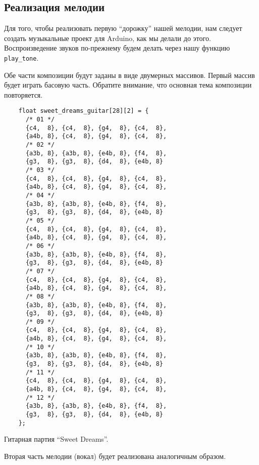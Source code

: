 \documentclass[../sparc.tex]{subfiles}
\begin{document}
\newpage
\subsection{Реализация мелодии}

Для того, чтобы реализовать первую ``дорожку'' нашей мелодии, нам следует
создать музыкальные проект для Arduino, как мы делали до этого.  Воспроизведение
звуков по-прежнему будем делать через нашу функцию \texttt{play\_tone}.

Обе части композиции будут заданы в виде двумерных массивов.  Первый массив
будет играть басовую часть.  Обратите внимание, что основная тема композиции
повторяется.

\begin{listing}[H]
  \begin{verbatim}
    float sweet_dreams_guitar[28][2] = {
      /* 01 */
      {c4,  8}, {c4,  8}, {g4,  8}, {c4,  8},
      {a4b, 8}, {c4,  8}, {g4,  8}, {c4,  8},
      /* 02 */
      {a3b, 8}, {a3b, 8}, {e4b, 8}, {f4,  8},
      {g3,  8}, {g3,  8}, {d4,  8}, {e4b, 8}
      /* 03 */
      {c4,  8}, {c4,  8}, {g4,  8}, {c4,  8},
      {a4b, 8}, {c4,  8}, {g4,  8}, {c4,  8},
      /* 04 */
      {a3b, 8}, {a3b, 8}, {e4b, 8}, {f4,  8},
      {g3,  8}, {g3,  8}, {d4,  8}, {e4b, 8}
      /* 05 */
      {c4,  8}, {c4,  8}, {g4,  8}, {c4,  8},
      {a4b, 8}, {c4,  8}, {g4,  8}, {c4,  8},
      /* 06 */
      {a3b, 8}, {a3b, 8}, {e4b, 8}, {f4,  8},
      {g3,  8}, {g3,  8}, {d4,  8}, {e4b, 8}
      /* 07 */
      {c4,  8}, {c4,  8}, {g4,  8}, {c4,  8},
      {a4b, 8}, {c4,  8}, {g4,  8}, {c4,  8},
      /* 08 */
      {a3b, 8}, {a3b, 8}, {e4b, 8}, {f4,  8},
      {g3,  8}, {g3,  8}, {d4,  8}, {e4b, 8}
      /* 09 */
      {c4,  8}, {c4,  8}, {g4,  8}, {c4,  8},
      {a4b, 8}, {c4,  8}, {g4,  8}, {c4,  8},
      /* 10 */
      {a3b, 8}, {a3b, 8}, {e4b, 8}, {f4,  8},
      {g3,  8}, {g3,  8}, {d4,  8}, {e4b, 8}
      /* 11 */
      {c4,  8}, {c4,  8}, {g4,  8}, {c4,  8},
      {a4b, 8}, {c4,  8}, {g4,  8}, {c4,  8},
      /* 12 */
      {a3b, 8}, {a3b, 8}, {e4b, 8}, {f4,  8},
      {g3,  8}, {g3,  8}, {d4,  8}, {e4b, 8}
    };
  \end{verbatim}
  \label{listing:music-band-sweet-dreams-1}
  \caption{Гитарная партия ``Sweet Dreams''.}
\end{listing}

Вторая часть мелодии (вокал) будет реализована аналогичным образом.
\end{document}
